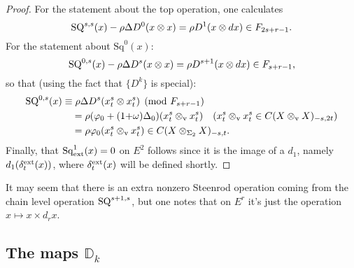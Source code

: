 \documentclass[11pt]{amsart}
\theoremstyle{plain}
\newtheorem{prop}[thm]{Proposition}
\theoremstyle{definition}
\let\phi\varphi
\renewcommand{\to}{\longrightarrow}
\theoremstyle{plain}
\newcommand{\twist}{\omega}
\newcommand{\Sq}{\mathrm{Sq}}
\begin{document}
\begin{External spectral sequence operations}
\begin{proof}
For the statement about the top operation, one calculates
\[\textup{SQ}^{s,s}(x)-\rho\Delta D^0(x\otimes x)=\rho D^{1}(x\otimes dx)\in F_{2s+r-1}.\]
For the statement about $\Sq^0(x)$:
\[\textup{SQ}^{0,s}(x)-\rho\Delta D^s(x\otimes x)=\rho D^{s+1}(x\otimes dx)\in F_{s+r-1},\]
so that (using the fact that $\{D^k\}$ is special):
\begin{alignat*}{2}
\textup{SQ}^{0,s}(x)
&\equiv
\rho\Delta D^s(x^s_t\otimes x^s_t)\pmod{F_{s+r-1}}%
\\
&\quad =
\rho(\phi_0+(1{+}\twist)\Delta_0)(x^s_t\otimes_\textup{v} x^s_t)%
\quad\text{($x^s_t\otimes_\textup{v} x^s_t\in C(X\otimes_\textup{v}X)_{-s,2t}$)}\\
&\quad =
\rho\phi_0(x^s_t\otimes_\textup{v} x^s_t)\in C(X\otimes_{\Sigma_2} X)_{-s,t}.
\end{alignat*}
Finally, that $\Sq^1_\textup{ext}(x)=0$ on $E^2$ follows since it is the image of a $d_1$, namely $d_1(\delta_t^\textup{ext}(x))$, where $\delta_t^\textup{ext}(x)$ will be defined shortly.
\end{proof}
It may seem that there is an extra nonzero Steenrod operation coming from the chain level operation $\textup{SQ}^{s+1,s}$, but one notes that on $E^r$ it's just the operation $x\mapsto x\times d_rx$.

\subsection{The maps $\mathbb{D}_k$}


\end{External spectral sequence operations}
\end{document}
